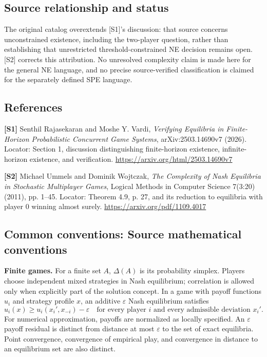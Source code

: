 \documentclass[11pt,a4paper]{article}
\begin{document}
\subsection*{Source relationship and status}
The original catalog overextends [S1]'s discussion: that source concerns unconstrained existence, including the two-player question, rather than establishing that unrestricted threshold-constrained NE decision remains open. [S2] corrects this attribution. No unresolved complexity claim is made here for the general NE language, and no precise source-verified classification is claimed for the separately defined SPE language.
\subsection*{References}
\begingroup\footnotesize\raggedright
\textbf{[S1]} Senthil Rajasekaran and Moshe Y. Vardi, \emph{Verifying Equilibria in Finite-Horizon Probabilistic Concurrent Game Systems}, arXiv:2503.14690v7 (2026). Locator: Section 1, discussion distinguishing finite-horizon existence, infinite-horizon existence, and verification. \url{https://arxiv.org/html/2503.14690v7}

\textbf{[S2]} Michael Ummels and Dominik Wojtczak, \emph{The Complexity of Nash Equilibria in Stochastic Multiplayer Games}, Logical Methods in Computer Science 7(3:20) (2011), pp. 1--45. Locator: Theorem 4.9, p. 27, and its reduction to equilibria with player 0 winning almost surely. \url{https://arxiv.org/pdf/1109.4017}
\par\endgroup

\subsection*{Common conventions: Source mathematical conventions}

\textbf{Finite games.} For a finite set $A$, $\Delta(A)$ is its probability
simplex. Players choose independent mixed strategies in Nash equilibrium;
correlation is allowed only when explicitly part of the solution concept.
In a game with payoff functions $u_i$ and strategy profile $x$, an additive
$\varepsilon$ Nash equilibrium satisfies
\[
 u_i(x)\geq u_i(x_i',x_{-i})-\varepsilon
 \quad\text{for every player $i$ and every admissible deviation $x_i'$}.
\]
For numerical approximation, payoffs are normalized as locally specified.
An $\varepsilon$ payoff residual is distinct from distance at most
$\varepsilon$ to the set of exact equilibria. Point convergence, convergence
of empirical play, and convergence in distance to an equilibrium set are
also distinct.
\end{document}
